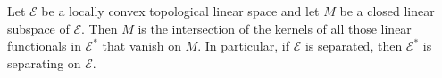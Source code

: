Let $\mathcal{E}$ be a locally convex topological linear space and let $M$ be a closed linear subspace of $\mathcal{E}$. Then $M$ is the intersection of the kernels of all those linear functionals in $\mathcal{E}^*$ that vanish on $M$. In particular, if $\mathcal{E}$ is separated, then $\mathcal{E}^*$ is separating on $\mathcal{E}$.
